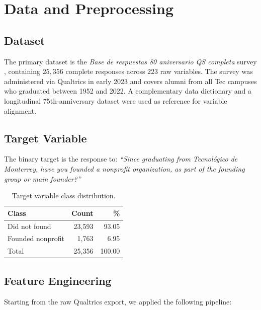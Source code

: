 \documentclass[10pt,twocolumn]{article}
\begin{document}
\section{Data and Preprocessing}
\label{sec:data}

\subsection{Dataset}

The primary dataset is the \emph{Base de respuestas 80 aniversario QS completa} survey \cite{qs2023}, containing $25{,}356$ complete responses across $223$ raw variables. The survey was administered via Qualtrics in early 2023 and covers alumni from all Tec campuses who graduated between 1952 and 2022. A complementary data dictionary and a longitudinal 75th-anniversary dataset \cite{qs2023} were used as reference for variable alignment.

\subsection{Target Variable}

The binary target is the response to: \emph{``Since graduating from Tecnológico de Monterrey, have you founded a nonprofit organization, as part of the founding group or main founder?''}

\begin{table}[H]
\centering
\caption{Target variable class distribution.}
\label{tab:target}
\begin{tabular}{lrr}
\toprule
Class & Count & \% \\
\midrule
Did not found & 23{,}593 & 93.05 \\
Founded nonprofit & 1{,}763 & 6.95 \\
\midrule
Total & 25{,}356 & 100.00 \\
\bottomrule
\end{tabular}
\end{table}

\subsection{Feature Engineering}

Starting from the raw Qualtrics export, we applied the following pipeline:
\end{document}
